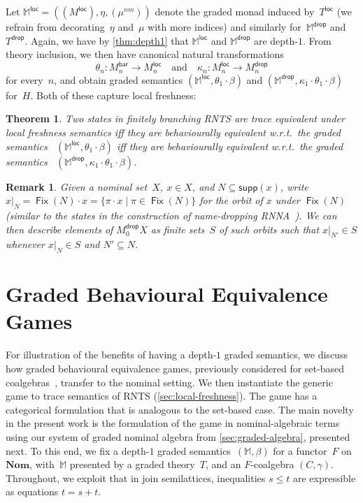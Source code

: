 \documentclass[11pt,a4paper]{amsart}
\newtheorem{theorem}{Theorem}[section]
\newtheorem{remark}[remark]{Remark}
\newcommand{\Br}{\mathsf{bar}}
\newcommand{\loc}{\mathsf{loc}}
\newcommand{\drop}{\mathsf{drop}}
\newcommand{\supp}{\mathsf{supp}}
\newcommand{\Fix}{\mathop{\mathsf{Fix}}}
\theoremstyle{plain}
\numberwithin{equation}{section}
\newcommand{\monad}{{\mathbb{M}}}
\newcommand{\+}[1]{\mathcal{#1}\xspace}
\newcommand{\Nom}{\mathbf{Nom}}
\theoremstyle{definition}
\begin{document}
Let $\monad^\loc=((M^\loc),\eta,(\mu^{nm}))$ denote the graded monad
induced by~$T^\loc$ (we refrain from decorating~$\eta$ and~$\mu$ with
more indices) and similarly for~$\monad^\drop$ and $T^\drop$. Again,
we have by \cref{thm:depth1} that $\monad^\loc$ and $\monad^\drop$ are
depth-$1$. From theory inclusion, we then have canonical natural
transformations
\begin{equation*}
  \theta_n\colon M_n^\Br \to M_n^\loc\quad \text{and}\quad\kappa_n\colon M_n^\loc \to M_n^\drop
\end{equation*}
for every~$n$, and obtain graded semantics
$(\monad^\loc,\theta_1\cdot\beta)$ and
$(\monad^\drop,\kappa_1\cdot\theta_1\cdot\beta)$
for~$H$. Both of these capture local freshness:

\begin{theorem}\label{thm:local-freshness}
  Two states in finitely branching RNTS are trace equivalent under
  local freshness semantics iff they are behaviourally equivalent
  w.r.t.~the graded semantics \mbox{
    $(\monad^\loc,\theta_1\cdot\beta)$} iff they are behaviourally
  equivalent w.r.t.~the graded semantics \mbox{
    $(\monad^\drop,\kappa_1\cdot\theta_1\cdot\beta)$}.
\end{theorem}

\begin{remark}
  \label{rem:namerestrictionmodel}
  Given a nominal set~$X$, $x\in X$, and $N \subseteq \supp(x)$, write
  $x|_N = \Fix(N) \cdot x = \{\pi \cdot x \mid \pi \in \Fix(N)\}$ for
  the orbit of $x$ under $\Fix(N)$ (similar to the states in the
  construction of name-dropping RNNA~\cite{SchroderEA17}). We can
  then describe elements of $M^\drop_0X$ as finite sets~$S$ of such
  orbits such that $x|_{N'} \in S$ whenever $x|_N \in S$ and
  $N' \subseteq N$.
\end{remark}




\section{Graded Behavioural Equivalence Games}
\label{sec:games}

For illustration of the benefits of having a depth-$1$ graded
semantics, we discuss how graded behavioural equivalence games,
previously considered for set-based coalgebras~\cite{FordEA22},
transfer to the nominal setting. We then instantiate the generic game
to trace semantics of RNTS (\cref{sec:local-freshness}). The game has
a categorical formulation that is analogous to the set-based case.  %
The main novelty in the present work is the
formulation of the game in nominal-algebraic terms using our system of
graded nominal algebra from \cref{sec:graded-algebra}, presented
next. To this end, we fix a depth-$1$ graded
semantics~$(\monad,\beta)$ for a functor~$F$ on~$\Nom$, with~$\monad$
presented by a graded theory~$T$, and an $F$-coalgebra
$(C,\gamma)$. Throughout, we exploit that in join semilattices,
inequalities $s\le t$ are expressible as equations $t=s+t$.
\end{document}
